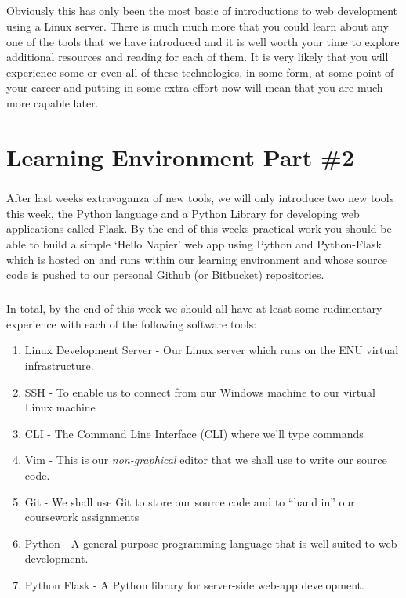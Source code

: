 \documentclass[12pt, a4paper, oneside]{book}
\begin{document}
\paragraph{} Obviously this has only been the most basic of introductions to web development using a Linux server. There is much much more that you could learn about any one of the tools that we have introduced and it is well worth your time to explore additional resources and reading for each of them. It is very likely that you will experience some or even all of these technologies, in some form, at some point of your career and putting in some extra effort now will mean that you are much more capable later.


\chapter{Learning Environment Part \#2}
\label{lab2}
\paragraph{} After last weeks extravaganza of new tools, we will only introduce two new tools this week, the Python language and a Python Library for developing web applications called Flask. By the end of this weeks practical work you should be able to build a simple `Hello Napier' web app using Python and Python-Flask which is hosted on and runs within our learning environment and whose source code is pushed to our personal Github (or Bitbucket) repositories. 

\paragraph{} In total, by the end of this week we should all have at least some rudimentary experience with each of the following software tools:

\begin{enumerate}
\item Linux Development Server - Our Linux server which runs on the ENU virtual infrastructure.
\item SSH - To enable us to connect from our Windows machine to our virtual Linux machine
\item CLI - The Command Line Interface (CLI) where we'll type commands
\item Vim - This is our \emph{non-graphical} editor that we shall use to write our source code. 
\item Git - We shall use Git to store our source code and to ``hand in'' our coursework assignments
\item Python - A general purpose programming language that is well suited to web development.
\item Python Flask - A Python library for server-side web-app development.
\end{enumerate}
\end{document}
